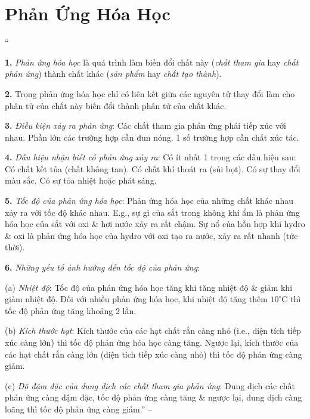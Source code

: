 \documentclass{article}
\numberwithin{equation}{section}
\begin{document}
\section{Phản Ứng Hóa Học}
``\begin{enumerate*}
	\item[\textbf{1.}] \textit{Phản ứng hóa học} là quá trình làm biến đổi chất này (\textit{chất tham gia} hay \textit{chất phản ứng}) thành chất khác (\textit{sản phẩm} hay \textit{chất tạo thành}).
	\item[\textbf{2.}] Trong phản ứng hóa học chỉ có liên kết giữa các nguyên tử thay đổi làm cho phân tử của chất này biến đổi thành phân tử của chất khác.
	\item[\textbf{3.}] \textit{Điều kiện xảy ra phản ứng}: Các chất tham gia phản ứng phải tiếp xúc với nhau. Phần lớn các trường hợp cần đun nóng. 1 số trường hợp cần chất xúc tác.
	\item[\textbf{4.}] \textit{Dấu hiệu nhận biết có phản ứng xảy ra}: Có ít nhất 1 trong các dấu hiệu sau: Có chất kết tủa (chất không tan). Có chất khí thoát ra (sủi bọt). Có sự thay đổi màu sắc. Có sự tỏa nhiệt hoặc phát sáng.
	\item[\textbf{5.}] \textit{Tốc độ của phản ứng hóa học}: Phản ứng hóa học của những chất khác nhau xảy ra với tốc độ khác nhau. E.g., sự gỉ của sắt trong không khí ẩm là phản ứng hóa học của sắt với oxi \& hơi nước xảy ra rất chậm. Sự nổ của hỗn hợp khí hydro \& oxi là phản ứng hóa học của hydro với oxi tạo ra nước, xảy ra rất nhanh (tức thời).
	\item[\textbf{6.}] \textit{Những yếu tố ảnh hưởng đến tốc độ của phản ứng}:
	\begin{enumerate*}
		\item[(a)] \textit{Nhiệt độ}: Tốc độ của phản ứng hóa học tăng khi tăng nhiệt độ \& giảm khi giảm nhiệt độ. Đối với nhiều phản ứng hóa học, khi nhiệt độ tăng thêm $10^\circ$C thì tốc độ phản ứng tăng khoảng $2$ lần.
		\item[(b)] \textit{Kích thước hạt}: Kích thước của các hạt chất rắn càng nhỏ (i.e., diện tích tiếp xúc càng lớn) thì tốc độ phản ứng hóa học càng tăng. Ngược lại, kích thước của các hạt chất rắn càng lớn (diện tích tiếp xúc càng nhỏ) thì tốc độ phản ứng càng giảm.
		\item[(c)] \textit{Độ đậm đặc của dung dịch các chất tham gia phản ứng}: Dung dịch các chất phản ứng càng đậm đặc, tốc độ phản ứng càng tăng \& ngược lại, dung dịch càng loãng thì tốc độ phản ứng càng giảm.'' -- \cite[p. 34]{Truong_BTNC_Hoa_Hoc_8_2022}
	\end{enumerate*}	
\end{enumerate*}
\end{document}
